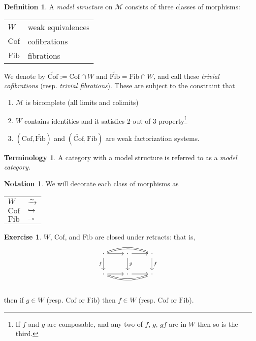 \documentclass[12pt]{amsart}
\let\til\widetilde
\theoremstyle{definition}
\newtheorem{definition}[theorem]{Definition}
\newtheorem{exercise}[theorem]{Exercise}
\newtheorem{notation}[theorem]{Notation}
\newtheorem{terminology}[theorem]{Terminology}
\providecommand{\Cof}{\text{Cof}}
\providecommand{\Fib}{\text{Fib}}
\begin{document}
\begin{definition} A \textit{model structure} on $\mathcal{M}$ consists of three classes of morphisms:
\begin{center}
    \begin{tabular}{l | l}
    $W$ & weak equivalences \\
    $\Cof$ & cofibrations \\
    $\Fib$ & fibrations
    \end{tabular}
\end{center}
We denote by $\widetilde{\Cof}:= \Cof \cap W$ and $\widetilde{\Fib} = \Fib \cap W$, and call these \textit{trivial cofibrations} (resp. \textit{trivial fibrations}). These are subject to the constraint that
\begin{enumerate}
    \item $\mathcal{M}$ is bicomplete (all limits and colimits)
    \item $W$ contains identities and it satisfies 2-out-of-3 property\footnote{If $f$ and $g$ are composable, and any two of $f$, $g$, $gf$ are in $W$ then so is the third.}
    \item $\left( \Cof, \til{\Fib} \right)$ and $\left( \widetilde{\Cof}, \Fib \right)$ are weak factorization systems.
\end{enumerate}
\end{definition}

\begin{terminology} A category with a model structure is referred to as a \textit{model category}.
\end{terminology}


\begin{notation} We will decorate each class of morphisms as
\begin{center}
\begin{tabular}{l | l}
    $W$ & $\xrightarrow{\sim}$ \\
    $\Cof$ & $\xhookrightarrow{}$ \\
    $\Fib$ & $\twoheadrightarrow$
    \end{tabular}
\end{center}
\end{notation}


\begin{exercise} $W$, $\Cof$, and $\Fib$ are closed under retracts: that is,
\[ \begin{tikzcd}
    \cdot\dar["f" left]\rar\ar[rr,equal,bend left=20] & \cdot\dar["g"]\rar & \cdot\dar["f"]\\
    \cdot\rar\ar[rr,equal,bend right=20] & \cdot\rar & \cdot\\
\end{tikzcd} \]
then if $g\in W$ (resp. $\Cof$ or $\Fib$) then $f\in W$ (resp. $\Cof$ or $\Fib$).
\end{exercise}
\end{document}
